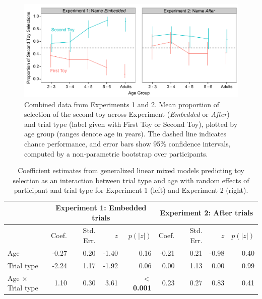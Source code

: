 \documentclass[man]{apa2}
\begin{document}
\begin{figure}
  \begin{center} 
    \includegraphics[width=6in]{figures/continuity_kids_and_adults_final.pdf} 
    \caption{\label{fig:res5} Combined data from Experiments 1 and 2.  Mean proportion of selection of the second toy across Experiment (\emph{Embedded} or \emph{After}) and trial type (label given with First Toy or Second Toy), plotted by age group (ranges denote age in years). The dashed line indicates chance performance, and error bars show 95\% confidence intervals, computed by a non-parametric bootstrap over participants.} 
  \end{center} 
\end{figure}	



  \begin{table} [t]
   \caption{Coefficient estimates from generalized linear mixed models predicting toy selection as an interaction between trial type and age with random effects of participant and trial type for Experiment 1 (left) and Experiment 2 (right).
   \label{tab:coefficient_estimates} } 
   \begin{center} 
     \begin{tabular}{lrrrr|rrrr} 
          & \multicolumn{4}{c}{Experiment 1: Embedded trials} &  \multicolumn{4}{c}{Experiment 2: After trials}\\
                      \hline 
       \null  & Coef. & Std. Err. & $z$  &  $p(|z|)$ & Coef. & Std. Err. & $z$  &  $p(|z|)$  \\ 
       \hline  
        Age   & -0.27 	&  0.20 & -1.40 & 0.16						               & -0.21 & 0.21 & -0.98 & 0.40\\ 
        Trial type   & -2.24 & 1.17 &  -1.92 & 0.06				                       & 0.00 & 1.13 & 0.00 & 0.99 \\
        Age $\times$ Trial type    & 1.10 & 0.30 & 3.61 &\textbf{ $<$0.001} 		& 0.23 & 0.27 & 0.83 & 0.41\\ 
       \hline 
     \end{tabular} 
  \end{center}
 \end{table}
 
\end{document}
